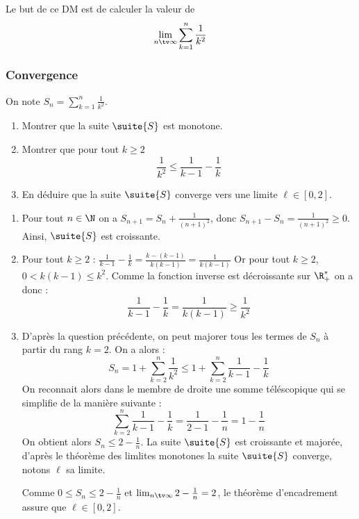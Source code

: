 




Le but de ce DM est de calculer la valeur de 
$$\lim_{n\tv \infty} \sum_{k=1}^n \frac{1}{k^2}$$

\subsubsection{Convergence}
On note $S_n=  \sum_{k=1}^n \frac{1}{k^2}$.

\begin{enumerate}
\item Montrer que la suite $\suite{S}$  est monotone. 
\item Montrer que pour tout $k\geq 2$
$$\frac{1}{k^2} \leq \frac{1}{k-1}-\frac{1}{k}$$
\item En déduire que la suite $\suite{S}$ converge vers une limite $\ell \in [0,2]$. 
\end{enumerate}

\begin{correction}
\begin{enumerate}
\item Pour tout $n\in \N$ on a  $S_{n+1} = S_n + \frac{1}{(n+1)^2}$, donc 
$S_{n+1}-S_n = \frac{1}{(n+1)^2}\geq 0$. Ainsi, $\suite{S}$ est croissante. 
\item Pour tout $k\geq 2$ : $\frac{1}{k-1}-\frac{1}{k}= \frac{k-(k-1)}{k(k-1)}= \frac{1}{k(k-1)}$
Or pour tout $k\geq 2$,  $0<k(k-1) \leq k^2$. Comme la fonction inverse est décroissante sur $\R_+^*$ on a donc : 
$$\frac{1}{k-1}-\frac{1}{k}=\frac{1}{k(k-1)}\geq \frac{1}{k^2}$$

\item  D'après la question précédente, on peut majorer tous les termes de $S_n$ à partir du rang $k=2$. On  a alors : 
$$S_n = 1+ \sum_{k=2}^n\frac{1}{k^2} \leq 1 + \sum_{k=2}^n\frac{1}{k-1} -\frac{1}{k}$$
On reconnait alors dans le  membre de droite une somme téléscopique qui se simplifie de la manière suivante : 
$$\sum_{k=2}^n\frac{1}{k-1} -\frac{1}{k} = \frac{1}{2-1} -\frac{1}{n} = 1-\frac{1}{n}$$
On obtient alors $S_n  \leq 2-\frac{1}{n}$. 
La suite $\suite{S}$ est croissante et majorée, d'après le théorème des limlites monotones la suite $\suite{S}$ converge, notons $\ell$ sa limite. 

Comme $0\leq S_n\leq 2-\frac{1}{n}$ et $\lim_{n\tv \infty} 2-\frac{1}{n}=2$, le théorème d'encadrement assure que $\ell\in [0,2]$. 
 


\end{enumerate}
\end{correction}